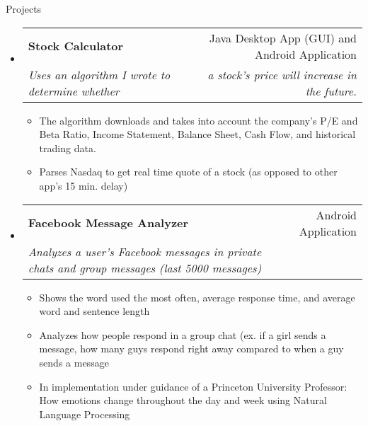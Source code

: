 \documentclass[letterpaper,11pt]{article}
\makeatletter
\newcommand{\resitem}[1]{\item #1 \vspace{-2pt}}
\newcommand{\resheading}[1]{{\large \parashade[.9]{sharpcorners}{\textbf{#1 \vphantom{p\^{E}}}}}}
\newcommand{\ressubheading}[4]{
\begin{tabular*}{6.5in}{l@{\extracolsep{\fill}}r}
		\textbf{#1} & #2 \\
		\textit{#3} & \textit{#4} \\
\end{tabular*}\vspace{-6pt}}
\makeatother
\begin{document}
\begin{description} \item[Projects] \end{description}
\begin{itemize}

\item
	\ressubheading{Stock Calculator}{Java Desktop App (GUI) and Android Application}{Uses an algorithm I wrote to determine whether}{a stock's price will increase in the future.\space\space\space\space\space\space\space\space\space}
	\begin{itemize}
		\resitem{The algorithm downloads and takes into account the company’s P/E and Beta Ratio, Income Statement, Balance Sheet, Cash Flow, and historical trading data.}
		\resitem{Parses Nasdaq to get real time quote of a stock (as opposed to other app's 15 min. delay)}
	\end{itemize}

\item
	\ressubheading{Facebook Message Analyzer}{Android Application}{Analyzes a user’s Facebook messages in private chats and group messages (last 5000 messages)}{}
	\begin{itemize}
		\resitem{Shows the word used the most often, average response time, and average word and sentence length}
		\resitem{Analyzes how people respond in a group chat (ex. if a girl sends a message, how many guys respond right away compared to when a guy sends a message}
		\resitem{In implementation under guidance of a 					Princeton University Professor: How emotions change
throughout the day and week using Natural Language Processing}
	\end{itemize}

\end{itemize}
\end{document}

